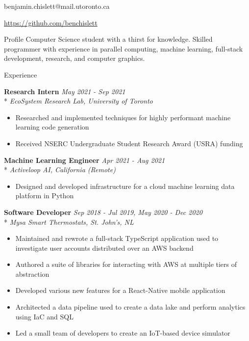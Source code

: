 \documentclass[11pt, letterpaper]{article}
\title{}
\author{Benjamin Chislett}
\date{}
\begin{document}
\begin{center}
  \Huge\theauthor
  \par
  \large{benjamin.chislett@mail.utoronto.ca}
  \par
  \large\url{https://github.com/benchislett}
\end{center}

\begin{section}{Profile}
Computer Science student with a thirst for knowledge.
Skilled programmer with experience in parallel computing, machine learning, full-stack development, research, and computer graphics.

\end{section}

\begin{section}{Experience}

\textbf{Research Intern}
\hfill
\textit{May 2021 - Sep 2021}\\*
\textit{EcoSystem Research Lab, University of Toronto}
\begin{itemize}
  \item Researched and implemented techniques for highly performant machine learning code generation
  \item Received NSERC Undergraduate Student Research Award (USRA) funding \\
\end{itemize}

\textbf{Machine Learning Engineer}
\hfill
\textit{Apr 2021 - Aug 2021}\\*
\textit{Activeloop AI, California (Remote)}
\begin{itemize}
  \item Designed and developed infrastructure for a cloud machine learning data platform in Python \\
\end{itemize}

\textbf{Software Developer}
\hfill
\textit{Sep 2018 - Jul 2019, May 2020 - Dec 2020}\\*
\textit{Mysa Smart Thermostats, St. John's, NL}
\begin{itemize}
  \item Maintained and rewrote a full-stack TypeScript application used to investigate user accounts distributed over an AWS backend
  \item Authored a suite of libraries for interacting with AWS at multiple tiers of abstraction
  \item Developed various new features for a React-Native mobile application
  \item Architected a data pipeline used to create a data lake and perform analytics using IaC and SQL
  \item Led a small team of developers to create an IoT-based device simulator \\
\end{itemize}


\end{section}
\end{document}
